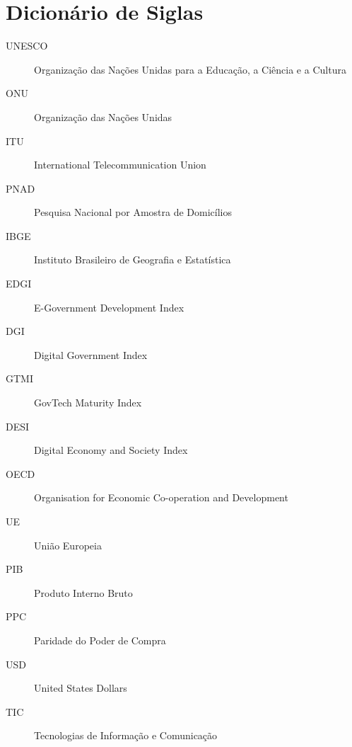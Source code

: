 \section*{Dicionário de Siglas}

\begin{description}
    \item[UNESCO] Organização das Nações Unidas para a Educação, a Ciência e a Cultura
    \item[ONU] Organização das Nações Unidas
    \item[ITU] International Telecommunication Union
    \item[PNAD] Pesquisa Nacional por Amostra de Domicílios
    \item[IBGE] Instituto Brasileiro de Geografia e Estatística
    \item[EDGI] E-Government Development Index
    \item[DGI] Digital Government Index  
    \item[GTMI] GovTech Maturity Index
    \item[DESI] Digital Economy and Society Index 
    \item[OECD] Organisation for Economic Co-operation and Development
    \item[UE] União Europeia 
    \item[PIB] Produto Interno Bruto 
    \item[PPC] Paridade do Poder de Compra 
    \item[USD] United States Dollars
    \item[TIC] Tecnologias de Informação e Comunicação
\end{description}